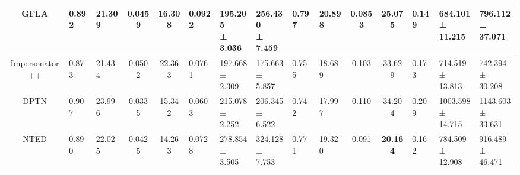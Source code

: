 \documentclass[10pt,twocolumn,letterpaper]{article}
\begin{document}
\begin{table*}[!htbp]
{\begin{tabularx}{\textwidth}{ll*{2}{p{0.5cm}}ccp{0.5cm}l@{}l|*{2}{p{0.5cm}}ccp{0.5cm}l@{}l}
\midrule

\multicolumn{2}{c}{\footnotesize{GFLA}} & \scriptsize{0.892} & \scriptsize{21.309} & \scriptsize{0.0459} & \scriptsize{16.308} & \scriptsize{0.0922} & \makecell{\scriptsize{195.205} \\  \scriptsize{± 3.036}} & \makecell{\scriptsize{256.430} \\ \scriptsize{± 7.459}} & \scriptsize{0.797} & \scriptsize{20.898} & \scriptsize{0.0853} & \scriptsize{25.075} & \scriptsize{0.149} & \makecell{\scriptsize{684.101} \\ \scriptsize{± 11.215}} & \makecell{\scriptsize{796.112} \\ \scriptsize{± 37.071}} \\

\midrule

\multicolumn{2}{c}{\footnotesize{Impersonator++}} & \scriptsize{0.873} & \scriptsize{21.434} & \scriptsize{0.0502} & \scriptsize{22.363} & \scriptsize{0.0761} & \makecell{\scriptsize{197.668} \\  \scriptsize{± 2.309}} & \makecell{\scriptsize{175.663} \\ \scriptsize{± 5.857}} & \scriptsize{0.755} & \scriptsize{18.689} & \scriptsize{0.103} & \scriptsize{33.629} & \scriptsize{0.173} & \makecell{\scriptsize{714.519} \\ \scriptsize{± 13.813}} & \makecell{\scriptsize{742.394} \\ \scriptsize{± 30.208}} \\

\midrule

\multicolumn{2}{c}{\footnotesize{DPTN}} & \scriptsize{0.907} & \scriptsize{23.996} & \scriptsize{0.0335} & \scriptsize{15.342} & \scriptsize{0.0603} & \makecell{\scriptsize{215.078} \\  \scriptsize{± 2.252}} & \makecell{\scriptsize{206.345} \\ \scriptsize{± 6.522}} & \scriptsize{0.742} & \scriptsize{17.997} & \scriptsize{0.110} & \scriptsize{34.204} & \scriptsize{0.209} & \makecell{\scriptsize{1003.598} \\ \scriptsize{± 14.715}} & \makecell{\scriptsize{1143.603} \\ \scriptsize{± 33.631}} \\

\midrule

\multicolumn{2}{c}{\footnotesize{NTED}} & \scriptsize{0.890} & \scriptsize{22.025} & \scriptsize{0.0425} & \scriptsize{14.263} & \scriptsize{0.0728} & \makecell{\scriptsize{278.854} \\  \scriptsize{± 3.505}} & \makecell{\scriptsize{324.128} \\ \scriptsize{± 7.753}} & \scriptsize{0.771} & \scriptsize{19.320} & \scriptsize{0.091} & \textbf{\scriptsize{20.164}} & \scriptsize{0.162} & \makecell{\scriptsize{784.509} \\ \scriptsize{± 12.908}} & \makecell{\scriptsize{916.489} \\ \scriptsize{± 46.471}} \\


\end{tabularx}}
\end{table*}
\end{document}
